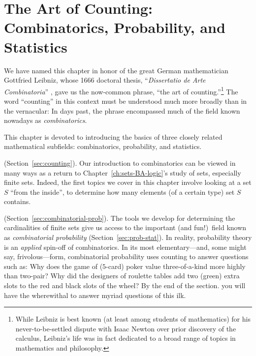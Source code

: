 
\chapter{The Art of Counting:
Combinatorics, Probability, and Statistics}
\label{ch:prob-stat}
\label{ch:combinatorics}

We have named this chapter in honor of the great German mathematician
Gottfried Leibniz,  whose
1666 doctoral thesis, ``{\it Dissertatio de Arte Combinatoria}''
\cite{Leibnitz}, gave us the now-common phrase, ``the art of
counting.''\footnote{While Leibniz is best known (at least among students of mathematics) for his
never-to-be-settled dispute with Isaac Newton 
over prior discovery of the calculus, Leibniz's life was in fact
dedicated to a broad range of topics in mathematics and philosophy.}
The word ``counting'' in this context must be understood
much more broadly than in the vernacular: In days past, the phrase
encompassed much of the field known nowadays as {\it
  combinatorics}. 

This chapter is devoted to introducing the basics of three closely related mathematical
subfields: combinatorics, probability, and statistics.

\medskip

 (Section~\ref{sec:counting}).
Our introduction to combinatorics can be viewed in many ways
as a return to Chapter~\ref{ch:sets-BA-logic}'s study of
sets, especially finite sets.  Indeed, the first topics we cover in
this chapter involve looking at a set $S$ ``from the inside'', to determine
how many elements (of a certain type) set $S$ contains.

\medskip

 (Section~\ref{sec:combinatorial-prob}).
The tools we develop for determining the cardinalities of finite sets
give us access to the important (and fun!)~field known as {\em
  combinatorial probability} 
(Section~\ref{sec:prob-stat}).  In reality, probability theory is an {\em applied} spin-off
of combinatorics.  In its most elementary---and, some might say, frivolous---form, combinatorial probability uses counting to 
answer questions such as:  Why does the game of
($5$-card) poker value three-of-a-kind more highly than two-pair?
Why did the designers of roulette tables add two (green) extra slots to
the red and black slots of the wheel?  By the end of the section. you will have the wherewithal to answer
myriad questions of this ilk.

